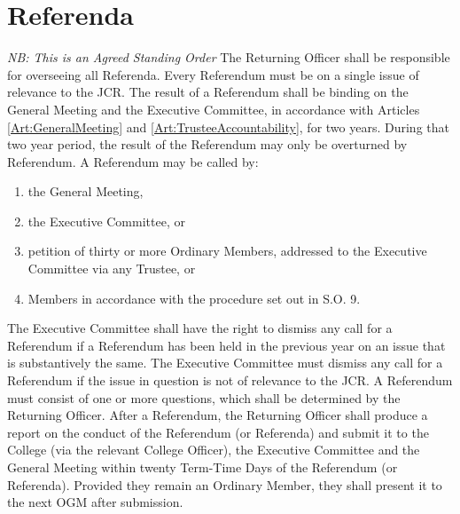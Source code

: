 \chapter{Referenda}
\textit{NB: This is an Agreed Standing Order}
\npara The Returning Officer shall be responsible for overseeing all Referenda.
\npara Every Referendum must be on a single issue of relevance to the JCR.  The result of a Referendum shall be binding on the General Meeting and the Executive Committee, in accordance with Articles \ref{Art:GeneralMeeting} and \ref{Art:TrusteeAccountability}, for two years.  During that two year period, the result of the Referendum may only be overturned by Referendum.
\npara A Referendum may be called by:
\begin{enumerate}
\item the General Meeting,
\item the Executive Committee, or
\item petition of thirty or more Ordinary Members, addressed to the Executive Committee via any Trustee, or
\item Members in accordance with the procedure set out in S.O. 9.
\end{enumerate}
\npara The Executive Committee shall have the right to dismiss any call for a Referendum if a Referendum has been held in the previous year on an issue that is substantively the same.  The Executive Committee must dismiss any call for a Referendum if the issue in question is not of relevance to the JCR.
\npara A Referendum must consist of one or more questions, which shall be determined by the Returning Officer.  After a Referendum, the Returning Officer shall produce a report on the conduct of the Referendum (or Referenda) and submit it to the College (via the relevant College Officer), the Executive Committee and the General Meeting within twenty Term-Time Days of the Referendum (or Referenda).  Provided they remain an Ordinary Member, they shall present it to the next OGM after submission.
